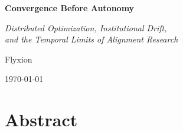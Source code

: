 \documentclass[12pt, oneside]{book}
\theoremstyle{plain}
\theoremstyle{definition}
\theoremstyle{remark}
\theoremstyle{definition}
\begin{document}
\begin{titlepage}
  \centering
  \vspace*{2cm}
  {\Huge\bfseries Convergence Before Autonomy\par}
  \vspace{0.5cm}
  {\large\itshape Distributed Optimization, Institutional Drift,\\
  and the Temporal Limits of Alignment Research\par}
  \vspace{3cm}
  \vfill
  {\large Flyxion\par}
  \vspace{0.5cm}
  {\normalsize \today\par}
\end{titlepage}

\frontmatter
\tableofcontents
\clearpage

\chapter*{Abstract}
\end{document}
